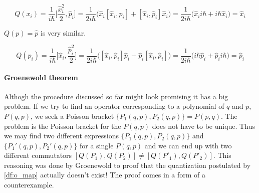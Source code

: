 \begin{equation*}
    Q(x_{i}) = \frac{1}{i \hbar}\bigg[\frac{\hat{x}_{i}^{2}}{2}, \hat{p}_{i}\bigg] = 
    \frac{1}{2 i \hbar} \big(\hat{x}_{i} [\hat{x}_{i}, \hat{p}_{i}] + [\hat{x}_{i}, \hat{p}_{i}] \hat{x}_{i}\big) =
    \frac{1}{2 i \hbar} \big(\hat{x}_{i} i \hbar + i \hbar \hat{x}_{i}\big) = \hat{x}_{i}
\end{equation*}

 $Q(p) = \hat{p}$ is very similar.

\begin{equation*}
    Q(p_{i}) = \frac{1}{i \hbar}\bigg[\hat{x}_{i}, \frac{\hat{p}_{i}^{2}}{2}\bigg] = 
    \frac{1}{2 i \hbar} \big([\hat{x}_{i}, \hat{p}_{i}] \hat{p}_{i} + \hat{p}_{i} [\hat{x}_{i}, \hat{p}_{i}]\big) =
    \frac{1}{2 i \hbar} \big(i \hbar \hat{p}_{i} + \hat{p}_{i} i \hbar \big) = \hat{p}_{i}
\end{equation*}

\paragraph{Groenewold theorem} Althogh the procedure discussed so far might look promising it has a big problem.
If we try to find an operator corresponding to a polynomial of $q$ and $p$, $P(q, p)$, we seek a Poisson
bracket $\{P_{1}(q, p), P_{2}(q, p)\} = P(p, q)$. The problem is the Poisson bracket for the $P(q, p)$ does
not have to be unique. Thus we may find two different expressions $\{P_{1}(q, p), P_{2}(q, p)\}$ and $\{P_{1}'(q, p), P_{2}'(q, p)\}$
for a single $P(q, p)$ and we can end up with two different commutators $[Q(P_{1}), Q(P_{2})] \neq [Q(P'_{1}), Q(P'_{2})]$.
This reasoning was done by Groenewold to proof that the quantization postulated by \ref{df:o_map} actually doesn't
exist! The proof comes in a form of a counterexample.

